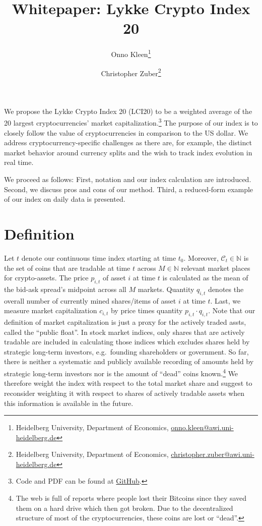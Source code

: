 \documentclass[11pt]{article}
\title{Whitepaper: Lykke Crypto Index 20}
\author{
Onno Kleen\thanks{Heidelberg University, Department of Economics, \href{mailto:onno.kleen@awi.uni-heidelberg.de}{onno.kleen@awi.uni-heidelberg.de}}
\and
Christopher Zuber\thanks{Heidelberg University, Department of Economics, \href{mailto:christopher.zuber@awi.uni-heidelberg.de}{christopher.zuber@awi.uni-heidelberg.de}}
}
\begin{document}
\maketitle


We propose the Lykke Crypto Index 20 (LCI20) to be a weighted average of the 20 largest cryptocurrencies' market capitalization.\footnote{Code and PDF can be found at \href{https://github.com/onnokleen/crypto-index}{GitHub}.}
The purpose of our index is to closely follow the value of cryptocurrencies in comparison to the US dollar.
We address cryptocurrency-specific challenges as there are, for example, the distinct market behavior around currency splits and the wish to track index evolution in real time.

We proceed as follows:
First, notation and our index calculation are introduced.
Second, we discuss pros and cons of our method.
Third, a reduced-form example of our index on daily data is presented.


\section{Definition}

Let $t$ denote our continuous time index starting at time $t_0$.
Moreover, $\mathcal{C}_t \in \mathbb{N}$ is the set of coins that are tradable at time $t$ across $M \in \mathbb{N}$ relevant market places for crypto-assets.
The price $p_{i,t}$ of asset $i$ at time $t$ is calculated as the mean of the bid-ask spread's midpoint across all $M$ markets.
Quantity $q_{i,t}$ denotes the overall number of currently mined shares/items of asset $i$ at time $t$.
Last, we measure market capitalization $c_{i,t}$ by price times quantity $p_{i,t} \cdot q_{i,t}$.
Note that our definition of market capitalization is just a proxy for the actively traded assts, called the ``public float''.
In stock market indices, only shares that are actively tradable are included in calculating those indices which excludes shares held by strategic long-term investors, e.g.\ founding shareholders or government.
So far, there is neither a systematic and publicly available recording of amounts held by strategic long-term investors nor is the amount of ``dead'' coins known.\footnote{The web is full of reports where people lost their Bitcoins since they saved them on a hard drive which then got broken. Due to the decentralized structure of most of the cryptocurrencies, these coins are lost or ``dead''.}
We therefore weight the index with respect to the total market share and suggest to reconsider weighting it with respect to shares of actively tradable assets when this information is available in the future.
\end{document}
